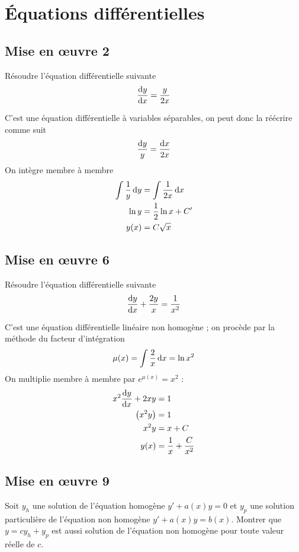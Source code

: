 \section{Équations différentielles}

\subsection{Mise en œuvre 2}
Résoudre l'équation différentielle suivante
\[ \frac{\operatorname{d}\! y}{\operatorname{d}\! x} = \frac{y}{2x} \]

\begin{solution}
    C'est une équation différentielle à variables séparables, on peut donc la réécrire comme suit
    \[ \frac{\operatorname{d}\! y}{y} = \frac{\operatorname{d}\! x}{2x} \]
    On intègre membre à membre
    \begin{align*}
        \int \frac{1}{y} \operatorname{d}\! y &= \int \frac{1}{2x} \operatorname{d}\! x \\
        \ln y &= \frac{1}{2} \ln x + C' \\
        y(x) &= C \sqrt{x}
    \end{align*}
\end{solution}

\subsection{Mise en œuvre 6}
Résoudre l'équation différentielle suivante
\[ \frac{\operatorname{d}\! y}{\operatorname{d}\! x} + \frac{2y}{x} = \frac{1}{x^2} \]

\begin{solution}
    C'est une équation différentielle linéaire non homogène ; on procède par la méthode du facteur d'intégration
    \[ \mu(x) = \int \frac{2}{x} \operatorname{d}\! x = \ln x^2 \]
    On multiplie membre à membre par $e^{\mu(x)} = x^2$ :
    \begin{align*}
        x^2 \frac{\operatorname{d}\! y}{\operatorname{d}\! x} + 2xy &= 1 \\
        \left( x^2 y \right) &= 1 \\
        x^2 y &= x + C \\
        y(x) &= \frac{1}{x} + \frac{C}{x^2}
    \end{align*}
\end{solution}

\subsection{Mise en œuvre 9}
Soit $y_h$ une solution de l'équation homogène $y' + a(x)y = 0$ et $y_p$ une solution particulière de l'équation non homogène $y' + a(x)y = b(x)$. Montrer que $y = cy_h + y_p$ est aussi solution de l'équation non homogène pour toute valeur réelle de $c$.

